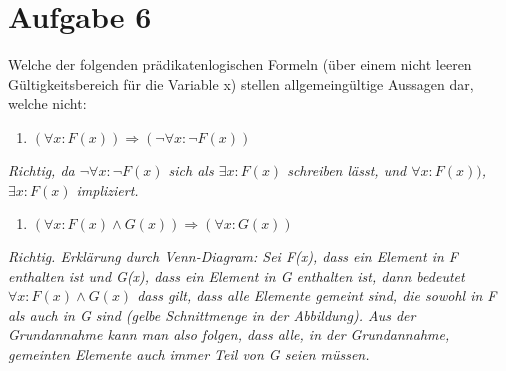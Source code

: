 \section*{Aufgabe 6}

Welche der folgenden prädikatenlogischen Formeln (über einem nicht leeren Gültigkeitsbereich für die Variable x) stellen allgemeingültige Aussagen dar, welche nicht:

\begin{enumerate}[label={a)}, leftmargin=*]
\item $(\forall x : F(x)) \Rightarrow (\lnot \forall x : \lnot F(x))$
\end{enumerate}

\textit{Richtig, da $\lnot \forall x : \lnot F(x)$ sich als $\exists x : F(x)$ schreiben lässt, und $\forall x : F(x))$, $\exists x : F(x)$ impliziert.}

\begin{enumerate}[label={b)}, leftmargin=*]
\item $(\forall x : F(x) \land G(x)) \Rightarrow (\forall x : G(x))$
\end{enumerate}

\textit{Richtig. Erklärung durch Venn-Diagram: Sei F(x), dass ein Element in F enthalten ist und G(x), dass ein Element in G enthalten ist, dann bedeutet $\forall x: F(x) \land G(x)$ dass gilt, dass alle Elemente gemeint sind, die sowohl in F als auch in G sind (gelbe Schnittmenge in der Abbildung). Aus der Grundannahme kann man also folgen, dass alle, in der Grundannahme, gemeinten Elemente auch immer Teil von G seien müssen.}

\begin{center}
\end{center}

